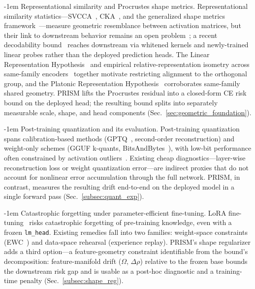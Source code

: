 \documentclass{article}
\makeatletter
\newlength{\paraSpace}
\renewcommand{\paragraph}{\@startsection{paragraph}{4}{\z@}%
  {\paraSpace}{-1em}%
  {\normalfont\normalsize\bfseries}}
\makeatother
\begin{document}
\paragraph{Representational similarity and Procrustes shape metrics.}
Representational similarity statistics---SVCCA~\cite{raghu2017svcca}, CKA~\cite{kornblith2019similarity}, and the generalized shape metrics framework~\cite{williams2021generalized}---measure geometric resemblance between activation matrices, but their link to downstream behavior remains an open problem~\cite{ding2021grounding, davari2023reliability, klabunde2023similarity}; a recent decodability bound~\cite{harvey2024what} reaches downstream via whitened kernels and newly-trained linear probes rather than the deployed prediction heads. The Linear Representation Hypothesis~\cite{park2023linear} and empirical relative-representation isometry across same-family encoders~\cite{moschella2022relative} together motivate restricting alignment to the orthogonal group, and the Platonic Representation Hypothesis~\cite{huh2024platonic} corroborates same-family shared geometry. PRISM lifts the Procrustes residual into a closed-form CE risk bound on the deployed head; the resulting bound splits into separately measurable scale, shape, and head components (Sec.~\ref{sec:geometric_foundation}).

\paragraph{Post-training quantization and its evaluation.}
Post-training quantization spans calibration-based methods (GPTQ~\cite{frantar2022gptq}, second-order reconstruction) and weight-only schemes (GGUF k-quants, BitsAndBytes~\cite{dettmers2022gpt3}), with low-bit performance often constrained by activation outliers~\cite{xiao2023smoothquant}. Existing cheap diagnostics---layer-wise reconstruction loss or weight quantization error---are indirect proxies that do not account for nonlinear error accumulation through the full network. PRISM, in contrast, measures the resulting drift end-to-end on the deployed model in a single forward pass (Sec.~\ref{subsec:quant_exp}).

\paragraph{Catastrophic forgetting under parameter-efficient fine-tuning.}
LoRA fine-tuning~\cite{hu2022lora} risks catastrophic forgetting of pre-training knowledge, even with a frozen \texttt{lm\_head}. Existing remedies fall into two families: weight-space constraints (EWC~\cite{kirkpatrick2017overcoming}) and data-space rehearsal (experience replay). PRISM's shape regularizer adds a third option---a feature-geometry constraint identifiable from the bound's decomposition: feature-manifold drift ($\Omega$, $\Delta\rho$) relative to the frozen base bounds the downstream risk gap and is usable as a post-hoc diagnostic and a training-time penalty (Sec.~\ref{subsec:shape_reg}).
\end{document}

